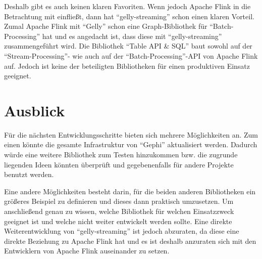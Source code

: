 Deshalb gibt es auch keinen klaren Favoriten. Wenn jedoch Apache Flink in die
Betrachtung mit einfließt, dann hat \enquote{gelly-streaming} schon einen klaren
Vorteil. Zumal Apache Flink mit \enquote{Gelly} schon eine Graph-Bibliothek für
\enquote{Batch-Processing} hat und es angedacht ist, dass diese mit
\enquote{gelly-streaming} zusammengeführt wird. Die Bibliothek \enquote{Table API \& SQL}
baut sowohl auf der \enquote{Stream-Processing}- wie auch auf der
\enquote{Batch-Processing}-\gls{API} von Apache Flink auf. Jedoch ist keine
der beteiligten Bibliotheken für einen produktiven Einsatz geeignet.

\section{Ausblick}
Für die nächsten Entwicklungsschritte bieten sich mehrere Möglichkeiten an. Zum
einen könnte die gesamte Infrastruktur von \enquote{Gephi} aktualisiert werden.
Dadurch würde eine weitere Bibliothek zum Testen hinzukommen bzw. die zugrunde
liegenden Ideen könnten überprüft und gegebenenfalls für andere Projekte benutzt
werden.

Eine andere Möglichkeiten besteht darin, für die beiden anderen Bibliotheken ein
größeres Beispiel zu definieren und dieses dann praktisch umzusetzen. Um
anschließend genau zu wissen, welche Bibliothek für welchen Einsatzzweck geeignet
ist und welche nicht weiter entwickelt werden sollte. Eine direkte Weiterentwicklung
von \enquote{gelly-streaming} ist jedoch abzuraten, da diese eine direkte Beziehung
zu Apache Flink hat und es ist deshalb anzuraten sich mit den Entwicklern von
Apache Flink auseinander zu setzen.
